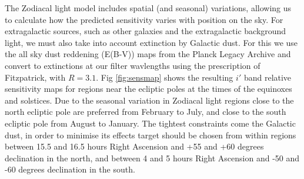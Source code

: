 \documentclass[]{iac}
\begin{document}
The Zodiacal light model includes spatial (and seasonal) variations, allowing us to calculate how the predicted
sensitivity varies with position on the sky. For extragalactic sources, such as other galaxies and the extragalactic
background light, we must also take into account extinction by Galactic dust. For this we use the all sky dust reddening
(E(B-V)) maps from the Planck Legacy Archive\cite{Abergel2014} and convert to extinctions at our filter wavlengths using
the prescription of Fitzpatrick\cite{Fitzpatrick1999}, with $R=3.1$.  Fig \ref{fig:sensmap} shows the resulting $i'$
band relative sensitivity maps for regions near the ecliptic poles at the times of the equinoxes and solstices. Due to
the seasonal variation in Zodiacal light regions close to the north ecliptic pole are preferred from February to July,
and close to the south ecliptic pole from August to January. The tightest constraints come the Galactic dust, in order
to minimise its effects target should be chosen from within regions between 15.5 and 16.5 hours Right Ascension and +55
and +60 degrees declination in the north, and between 4 and 5 hours Right Ascension and -50 and -60 degrees declination
in the south.
\end{document}
